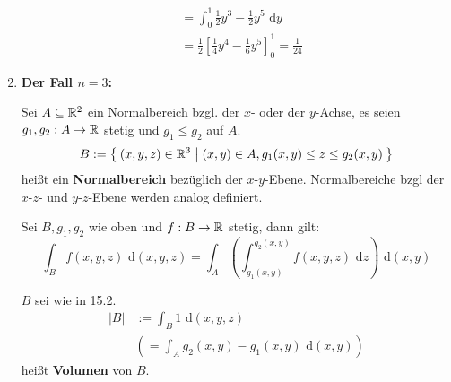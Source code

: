 \documentclass[a4paper,oneside,DIV15,BCOR12mm,chapterprefix=true,headings=onelinechapter]{scrbook}
\begin{document}
\begin{enumerate}
\begin{beispiele}
\begin{align*}
&=\int_0^1 \frac12y^3-\frac12y^5 \text{ d}y\\
&= \frac12 \left[ \frac14y^4-\frac16 y^5\right]_0^1 = \frac1{24}
\end{align*}
\end{beispiele}
\item \textbf{Der Fall $n=3$:}\\
\begin{definition}
Sei $A\subseteq\mathbb{R}^2$ ein Normalbereich bzgl. der $x$- oder der $y$-Achse,
es seien $g_1,g_2:A\to\mathbb{R}$ stetig und $g_1\le g_2$ auf $A$.
\[B:=\Set{(x,y,z)\in\ensuremath{\mathbb{R}}^3 | (x,y)\in A, g_1(x,y)\le z\le g_2(x,y)}\]
heißt ein \textbf{Normalbereich} bezüglich der $x$-$y$-Ebene.
Normalbereiche bzgl der $x$-$z$- und $y$-$z$-Ebene werden analog definiert.
\end{definition}

\begin{satz}
Sei $B, g_1, g_2$ wie oben und $f:B\to\mathbb{R}$ stetig, dann gilt:
\[\int_B f(x,y,z) \text{ d}(x,y,z) = \int_A\left(\int_{g_1(x,y)}^{g_2(x,y)} f(x,y,z) \text{ d}z\right)\text{ d}(x,y)\]
\end{satz}

\begin{definition}
$B$ sei wie in 15.2.
\begin{align*}
|B|&:=\int_B 1\text{ d}(x,y,z)\\
&\left( = \int_A g_2(x,y)-g_1(x,y)\text{ d}(x,y)\right)
\end{align*}
heißt \textbf{Volumen} von $B$.
\end{definition}



\end{enumerate}
\end{document}
